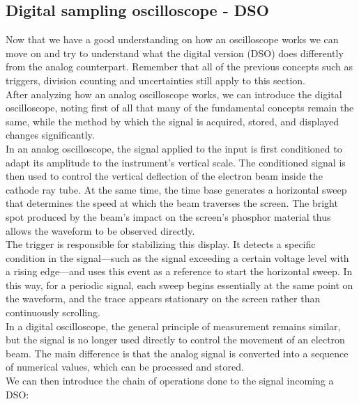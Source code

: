 \documentclass[../main.tex]{subfiles}
\begin{document}
\subsection{Digital sampling oscilloscope - DSO}

Now that we have a good understanding on how an oscilloscope works we can move on and try to understand what the digital version (DSO) does differently from the analog counterpart. Remember that all of the previous concepts such as triggers, division counting and uncertainties still apply to this section.\\

After analyzing how an analog oscilloscope works, we can introduce the digital oscilloscope, noting first of all that many of the fundamental concepts remain the same, while the method by which the signal is acquired, stored, and displayed changes significantly.\\

In an analog oscilloscope, the signal applied to the input is first conditioned to adapt its amplitude to the instrument’s vertical scale. The conditioned signal is then used to control the vertical deflection of the electron beam inside the cathode ray tube. At the same time, the time base generates a horizontal sweep that determines the speed at which the beam traverses the screen. The bright spot produced by the beam’s impact on the screen’s phosphor material thus allows the waveform to be observed directly.\\

The trigger is responsible for stabilizing this display. It detects a specific condition in the signal—such as the signal exceeding a certain voltage level with a rising edge—and uses this event as a reference to start the horizontal sweep. In this way, for a periodic signal, each sweep begins essentially at the same point on the waveform, and the trace appears stationary on the screen rather than continuously scrolling.\\

In a digital oscilloscope, the general principle of measurement remains similar, but the signal is no longer used directly to control the movement of an electron beam. The main difference is that the analog signal is converted into a sequence of numerical values, which can be processed and stored.\\

We can then introduce the chain of operations done to the signal incoming a DSO:\\
\end{document}
